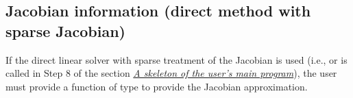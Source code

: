 \documentclass[letterpaper,10pt,english]{sphinxmanual}
\begin{document}
\subsection{Jacobian information (direct method with sparse Jacobian)}
\label{c_interface/User_supplied:cinterface-sparsejacobianfn}\label{c_interface/User_supplied:jacobian-information-direct-method-with-sparse-jacobian}
If the direct linear solver with sparse treatment of the Jacobian is
used (i.e., {\hyperref[c_interface/User_callable:ARKKLU]{}} or {\hyperref[c_interface/User_callable:ARKSuperLUMT]{}} is
called in Step 8 of the section {\hyperref[c_interface/Skeleton:cinterface-skeleton]{\emph{A skeleton of the user's main program}}}), the user
must provide a function of type {\hyperref[c_interface/User_supplied:ARKSlsSparseJacFn]{}} to provide
the Jacobian approximation.
\end{document}
